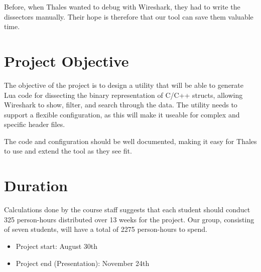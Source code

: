 Before, when Thales wanted to debug with Wireshark, they had to write the dissectors manually. Their hope is therefore that our tool can save them valuable time.


\section{Project Objective}
The objective of the project is to design a utility that will be able to generate Lua code for dissecting the binary representation of C/C++ structs, allowing Wireshark to show, filter, and search through the data.
The utility needs to support a flexible configuration, as this will make it useable for complex and specific header files. 

The code and configuration should be well documented, making it easy for Thales to use and extend the tool as they see fit.


\section{Duration}
Calculations done by the course staff suggests that each student should conduct 325 person-hours distributed over 13 weeks for the project. Our group, consisting of seven students, will have a total of 2275 person-hours to spend.\\
\begin {itemize}
	\item Project start: August 30th
	\item Project end (Presentation): November 24th
\end{itemize}

